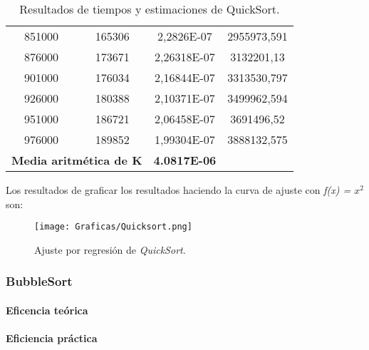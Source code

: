 \documentclass[a4paper,12pt]{article} %
\begin{document}
\begin{table}[H]
{\begin{tabular}{|c|c|c|c|}
			851000                                             & 165306               & 2,2826E-07                  & 2955973,591                                      \\
			876000                                             & 173671               & 2,26318E-07                 & 3132201,13                                       \\
			901000                                             & 176034               & 2,16844E-07                 & 3313530,797                                      \\
			926000                                             & 180388               & 2,10371E-07                 & 3499962,594                                      \\
			951000                                             & 186721               & 2,06458E-07                 & 3691496,52                                       \\
			976000                                             & 189852               & 1,99304E-07                 & 3888132,575                                      \\
			\hline
			\multicolumn{2}{l}{\textbf{Media aritmética de K}} & \textbf{4.0817E-06}                                                                                   \\
			\hline
		\end{tabular}%
	}
	\caption{Resultados de tiempos y estimaciones de QuickSort.}
	\label{tab:resultados}
\end{table}

Los resultados de graficar los resultados haciendo la curva de ajuste con \textit{f(x) = $x^{2}$} son:
\begin{figure}[H]
	\centering
	\texttt{[image: Graficas/Quicksort.png]}
	\caption{Ajuste por regresión de \textit{QuickSort}.}
\end{figure}

\subsubsection{BubbleSort}
\paragraph{Eficencia teórica}
\paragraph{Eficiencia práctica}
\end{document}
